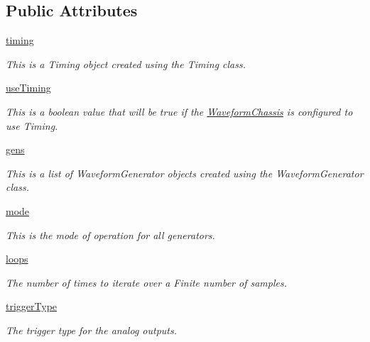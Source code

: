 \subsection*{Public Attributes}
\begin{DoxyCompactItemize}
\item 
\hyperlink{class_chassis_8git_1_1_waveform_chassis_1_1_w_c_low_level_a7e79ab2a3987e1f62ddba2cb94613af9}{timing}
\begin{DoxyCompactList}\small\item\em This is a Timing object created using the Timing class. \end{DoxyCompactList}\item 
\hyperlink{class_chassis_8git_1_1_waveform_chassis_1_1_w_c_low_level_adaf5c01accf94bdd2863537359418a0a}{use\-Timing}
\begin{DoxyCompactList}\small\item\em This is a boolean value that will be true if the \hyperlink{class_chassis_8git_1_1_waveform_chassis_1_1_waveform_chassis}{Waveform\-Chassis} is configured to use Timing. \end{DoxyCompactList}\item 
\hyperlink{class_chassis_8git_1_1_waveform_chassis_1_1_w_c_low_level_a424889fed4e03e248c5c9e08a5b6cc4e}{gens}
\begin{DoxyCompactList}\small\item\em This is a list of Waveform\-Generator objects created using the Waveform\-Generator class. \end{DoxyCompactList}\item 
\hyperlink{class_chassis_8git_1_1_waveform_chassis_1_1_w_c_low_level_aacffb88ec6de041d0b2e59218bfd32e9}{mode}
\begin{DoxyCompactList}\small\item\em This is the mode of operation for all generators. \end{DoxyCompactList}\item 
\hyperlink{class_chassis_8git_1_1_waveform_chassis_1_1_w_c_low_level_a0c7c0fc6eb769656a19f3fd65b179a00}{loops}
\begin{DoxyCompactList}\small\item\em The number of times to iterate over a Finite number of samples. \end{DoxyCompactList}\item 
\hyperlink{class_chassis_8git_1_1_waveform_chassis_1_1_w_c_low_level_aa54d2b2708f1f4e3793e3ca4918c8859}{trigger\-Type}
\begin{DoxyCompactList}\small\item\em The trigger type for the analog outputs. \end{DoxyCompactList}\item 

\end{DoxyCompactItemize}
